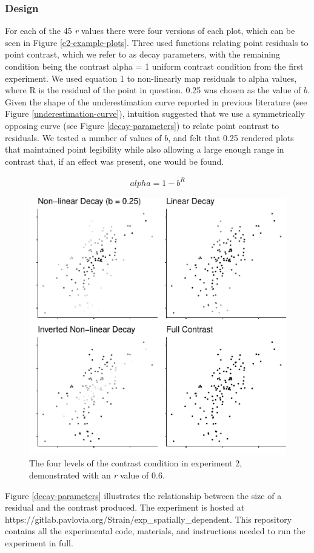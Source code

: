 \documentclass[preprint, 3p,
authoryear]{elsarticle} %
\begin{document}
\hypertarget{design-1}{%
\subsubsection{Design}\label{design-1}}

For each of the 45 \emph{r} values there were four versions of each
plot, which can be seen in Figure \ref{e2-example-plots}. Three used
functions relating point residuals to point contrast, which we refer to
as decay parameters, with the remaining condition being the contrast
alpha = 1 uniform contrast condition from the first experiment. We used
equation 1 to non-linearly map residuals to alpha values, where R is the
residual of the point in question. 0.25 was chosen as the value of
\(b\). Given the shape of the underestimation curve reported in previous
literature (see Figure \ref{underestimation-curve}), intuition suggested
that we use a symmetrically opposing curve (see Figure
\ref{decay-parameters}) to relate point contrast to residuals. We tested
a number of values of \(b\), and felt that 0.25 rendered plots that
maintained point legibility while also allowing a large enough range in
contrast that, if an effect was present, one would be found.

\begin{align}
  alpha = 1 - b^R
\end{align}

\begin{figure}

\includegraphics[width=0.5\linewidth]{contrast_and_scatterplots_files/figure-latex/e2-example-plots-1} \hfill{}

\caption{\label{e2-example-plots}The four levels of the contrast condition in experiment 2, demonstrated with an \textit{r} value of 0.6.}\label{fig:e2-example-plots}
\end{figure}

Figure \ref{decay-parameters} illustrates the relationship between the
size of a residual and the contrast produced. The experiment is hosted
at https://gitlab.pavlovia.org/Strain/exp\_spatially\_dependent. This
repository contains all the experimental code, materials, and
instructions needed to run the experiment in full.
\end{document}
